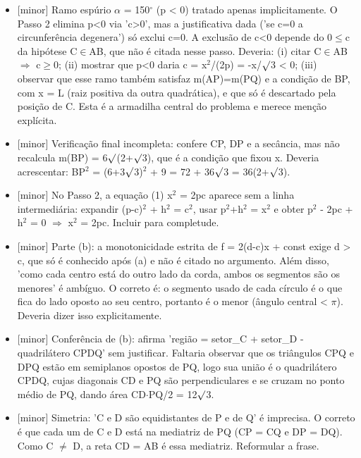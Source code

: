 \documentclass{article}%
\begin{document}
\begin{itemize}%
\item%
{[}minor{]} Ramo espúrio $\alpha$ = 150$^\circ$ (p < 0) tratado apenas implicitamente. O Passo 2 elimina p<0 via 'c>0', mas a justificativa dada ('se c=0 a circunferência degenera') só exclui c=0. A exclusão de c<0 depende do 0$\leq$c da hipótese C$\in$AB, que não é citada nesse passo. Deveria: (i) citar C$\in$AB $\Rightarrow$ c$\geq$0; (ii) mostrar que p<0 daria c = x$^2$/(2p) = -x/$\surd$3 < 0; (iii) observar que esse ramo também satisfaz m(AP)=m(PQ) e a condição de BP, com x = L (raiz positiva da outra quadrática), e que só é descartado pela posição de C. Esta é a armadilha central do problema e merece menção explícita.%
\item%
{[}minor{]} Verificação final incompleta: confere CP, DP e a secância, mas não recalcula m(BP) = 6$\surd$(2+$\surd$3), que é a condição que fixou x. Deveria acrescentar: BP$^2$ = (6+3$\surd$3)$^2$ + 9 = 72 + 36$\surd$3 = 36(2+$\surd$3).%
\item%
{[}minor{]} No Passo 2, a equação (1) x$^2$ = 2pc aparece sem a linha intermediária: expandir (p-c)$^2$ + h$^2$ = c$^2$, usar p$^2$+h$^2$ = x$^2$ e obter p$^2$ - 2pc + h$^2$ = 0 $\Rightarrow$ x$^2$ = 2pc. Incluir para completude.%
\item%
{[}minor{]} Parte (b): a monotonicidade estrita de f = 2(d-c)x + const exige d > c, que só é conhecido após (a) e não é citado no argumento. Além disso, 'como cada centro está do outro lado da corda, ambos os segmentos são os menores' é ambíguo. O correto é: o segmento usado de cada círculo é o que fica do lado oposto ao seu centro, portanto é o menor (ângulo central < $\pi$). Deveria dizer isso explicitamente.%
\item%
{[}minor{]} Conferência de (b): afirma 'região = setor\_C + setor\_D - quadrilátero CPDQ' sem justificar. Faltaria observar que os triângulos CPQ e DPQ estão em semiplanos opostos de PQ, logo sua união é o quadrilátero CPDQ, cujas diagonais CD e PQ são perpendiculares e se cruzam no ponto médio de PQ, dando área CD$\cdot$PQ/2 = 12$\surd$3.%
\item%
{[}minor{]} Simetria: 'C e D são equidistantes de P e de Q' é imprecisa. O correto é que cada um de C e D está na mediatriz de PQ (CP = CQ e DP = DQ). Como C $\neq$ D, a reta CD = AB é essa mediatriz. Reformular a frase.%
\end{itemize}%
\end{document}
